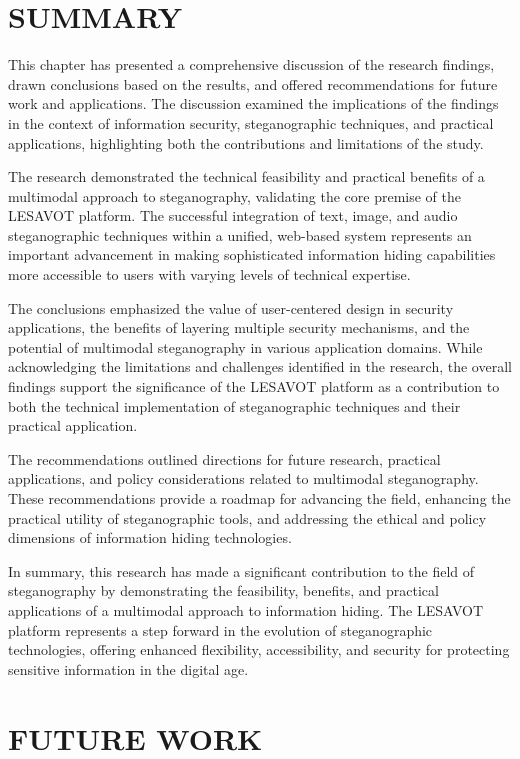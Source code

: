 \documentclass[12pt, a4paper, oneside]{book}
\begin{document}
\section{SUMMARY}

This chapter has presented a comprehensive discussion of the research findings, drawn conclusions based on the results, and offered recommendations for future work and applications. The discussion examined the implications of the findings in the context of information security, steganographic techniques, and practical applications, highlighting both the contributions and limitations of the study.

The research demonstrated the technical feasibility and practical benefits of a multimodal approach to steganography, validating the core premise of the LESAVOT platform. The successful integration of text, image, and audio steganographic techniques within a unified, web-based system represents an important advancement in making sophisticated information hiding capabilities more accessible to users with varying levels of technical expertise.

The conclusions emphasized the value of user-centered design in security applications, the benefits of layering multiple security mechanisms, and the potential of multimodal steganography in various application domains. While acknowledging the limitations and challenges identified in the research, the overall findings support the significance of the LESAVOT platform as a contribution to both the technical implementation of steganographic techniques and their practical application.

The recommendations outlined directions for future research, practical applications, and policy considerations related to multimodal steganography. These recommendations provide a roadmap for advancing the field, enhancing the practical utility of steganographic tools, and addressing the ethical and policy dimensions of information hiding technologies.

In summary, this research has made a significant contribution to the field of steganography by demonstrating the feasibility, benefits, and practical applications of a multimodal approach to information hiding. The LESAVOT platform represents a step forward in the evolution of steganographic technologies, offering enhanced flexibility, accessibility, and security for protecting sensitive information in the digital age.

\section{FUTURE WORK}
\end{document}
